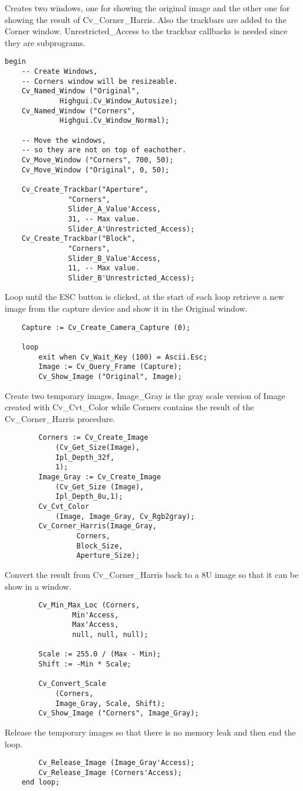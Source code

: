 Creates two windows, one for showing the original image and the other one for showing the result of Cv_Corner_Harris. Also the trackbars are added to the Corner window. Unrestricted_Access to the trackbar callbacks is needed since they are subprograms.
\begin{lstlisting}
begin
	-- Create Windows, 
	-- Corners window will be resizeable. 
	Cv_Named_Window ("Original",
			 Highgui.Cv_Window_Autosize);
	Cv_Named_Window ("Corners", 
			 Highgui.Cv_Window_Normal);

	-- Move the windows, 
	-- so they are not on top of eachother.
	Cv_Move_Window ("Corners", 700, 50);
	Cv_Move_Window ("Original", 0, 50);

	Cv_Create_Trackbar("Aperture",
			   "Corners",
			   Slider_A_Value'Access, 
			   31, -- Max value.
			   Slider_A'Unrestricted_Access);
  	Cv_Create_Trackbar("Block", 
			   "Corners", 
			   Slider_B_Value'Access,
			   11, -- Max value.
			   Slider_B'Unrestricted_Access);
\end{lstlisting}
Loop until the ESC button is clicked, at the start of each loop retrieve a new image from the capture device and show it in the Original window.
\begin{lstlisting}
	Capture := Cv_Create_Camera_Capture (0);

	loop
		exit when Cv_Wait_Key (100) = Ascii.Esc;
		Image := Cv_Query_Frame (Capture);
		Cv_Show_Image ("Original", Image);
\end{lstlisting}
Create two temporary images, Image_Gray is the gray scale version of Image created with Cv_Cvt_Color while Corners contains the result of the Cv_Corner_Harris procedure.
\begin{lstlisting}
		Corners := Cv_Create_Image
			(Cv_Get_Size(Image),
			Ipl_Depth_32f, 
			1);
		Image_Gray := Cv_Create_Image
			(Cv_Get_Size (Image),
			Ipl_Depth_8u,1);
		Cv_Cvt_Color
			(Image, Image_Gray, Cv_Rgb2gray);
		Cv_Corner_Harris(Image_Gray, 
				 Corners, 
				 Block_Size, 
			 	 Aperture_Size);
\end{lstlisting}
Convert the result from Cv_Corner_Harris back to a 8U image so that it can be show in a window.
\begin{lstlisting}
		Cv_Min_Max_Loc (Corners, 
			   	Min'Access, 
				Max'Access, 
				null, null, null);

		Scale := 255.0 / (Max - Min);
		Shift := -Min * Scale;

		Cv_Convert_Scale 
			(Corners, 
			Image_Gray, Scale, Shift);
		Cv_Show_Image ("Corners", Image_Gray);
\end{lstlisting}
Release the temporary images so that there is no memory leak and then end the loop.
\begin{lstlisting}
		Cv_Release_Image (Image_Gray'Access);
		Cv_Release_Image (Corners'Access);
	end loop;
\end{lstlisting}
